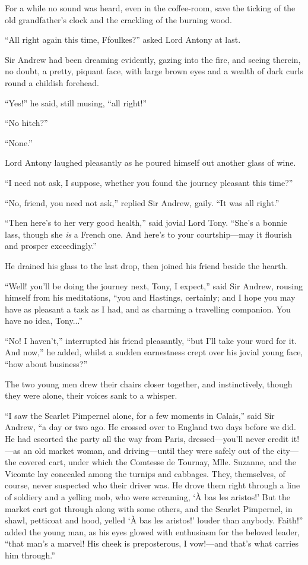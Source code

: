 \documentclass[paper=5.5in:8.5in,BCOR=7mm,twoside,DIV=calc,12pt,usegeometry,chapterprefix,endperiod,headings=big]{scrbook}
\begin{document}
For a while no sound was heard, even in the coffee-room, save the ticking of the old grandfather's clock and the crackling of the burning wood.

\enquote{All right again this time, Ffoulkes?} asked Lord Antony at last.

Sir Andrew had been dreaming evidently, gazing into the fire, and seeing therein, no doubt, a pretty, piquant face, with large brown eyes and a wealth of dark curls round a childish forehead.

\enquote{Yes!} he said, still musing, \enquote{all right!}

\enquote{No hitch?}

\enquote{None.}

Lord Antony laughed pleasantly as he poured himself out another glass of wine.

\enquote{I need not ask, I suppose, whether you found the journey pleasant this time?}

\enquote{No, friend, you need not ask,} replied Sir Andrew, gaily. \enquote{It was all right.}

\enquote{Then here's to her very good health,} said jovial Lord Tony. \enquote{She's a bonnie lass, though she \textit{is} a French one. And here's to your courtship---may it flourish and prosper exceedingly.}

He drained his glass to the last drop, then joined his friend beside the hearth.

\enquote{Well! you'll be doing the journey next, Tony, I expect,} said Sir Andrew, rousing himself from his meditations, \enquote{you and Hastings, certainly; and I hope you may have as pleasant a task as I had, and as charming a travelling companion. You have no idea, Tony...}

\enquote{No! I haven't,} interrupted his friend pleasantly, \enquote{but I'll take your word for it. And now,} he added, whilst a sudden earnestness crept over his jovial young face, \enquote{how about business?}

The two young men drew their chairs closer together, and instinctively, though they were alone, their voices sank to a whisper.

\enquote{I saw the Scarlet Pimpernel alone, for a few moments in Calais,} said Sir Andrew, \enquote{a day or two ago. He crossed over to England two days before we did. He had escorted the party all the way from Paris, dressed---you'll never credit it!---as an old market woman, and driving---until they were safely out of the city---the covered cart, under which the Comtesse de Tournay, Mlle. Suzanne, and the Vicomte lay concealed among the turnips and cabbages. They, themselves, of course, never suspected who their driver was. He drove them right through a line of soldiery and a yelling mob, who were screaming, \enquote{À bas les aristos!} But the market cart got through along with some others, and the Scarlet Pimpernel, in shawl, petticoat and hood, yelled \enquote{À bas les aristos!} louder than anybody. Faith!} added the young man, as his eyes glowed with enthusiasm for the beloved leader, \enquote{that man's a marvel! His cheek is preposterous, I vow!---and that's what carries him through.}
\end{document}
